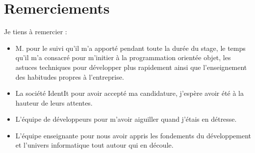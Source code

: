 \chapter*{Remerciements} %

Je tiens à remercier :
\begin{itemize}
\item M. pour le suivi qu'il m'a apporté pendant toute la durée du
stage, le temps qu'il m'a consacré pour m'initier à la programmation orientée
objet, les astuces techniques pour développer plus rapidement ainsi que
l'enseignement des habitudes propres à l'entreprise.
\item La société IdentIt pour avoir accepté ma candidature, j'espère avoir
été à la hauteur de leurs attentes.
\item L'équipe de développeurs pour m'avoir aiguiller quand j'étais en
détresse.
\item L'équipe enseignante pour nous avoir appris les fondements du
développement et l'univers informatique tout autour qui en découle.
\end{itemize}
